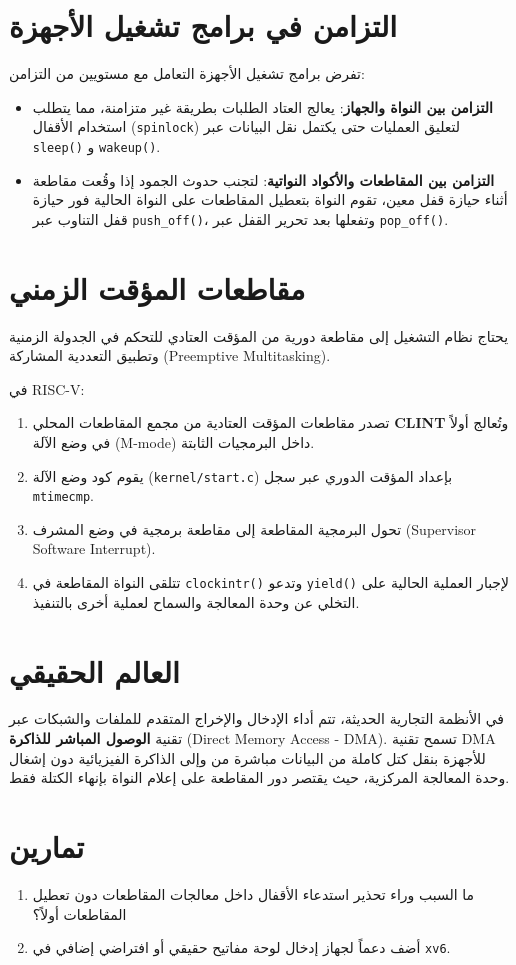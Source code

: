 \section{التزامن في برامج تشغيل الأجهزة}
\label{sec:concurrency_drivers}

تفرض برامج تشغيل الأجهزة التعامل مع مستويين من التزامن:
\begin{itemize}
  \item \textbf{التزامن بين النواة والجهاز}: يعالج العتاد الطلبات بطريقة غير متزامنة، مما يتطلب استخدام الأقفال (\texttt{spinlock}) لتعليق العمليات حتى يكتمل نقل البيانات عبر \texttt{sleep()} و \texttt{wakeup()}.
  \item \textbf{التزامن بين المقاطعات والأكواد النواتية}: لتجنب حدوث الجمود إذا وقُعت مقاطعة أثناء حيازة قفل معين، تقوم النواة بتعطيل المقاطعات على النواة الحالية فور حيازة قفل التناوب عبر \texttt{push\_off()}، وتفعلها بعد تحرير القفل عبر \texttt{pop\_off()}.
\end{itemize}

\section{مقاطعات المؤقت الزمني}
\label{sec:timer_interrupts}

يحتاج نظام التشغيل إلى مقاطعة دورية من المؤقت العتادي للتحكم في الجدولة الزمنية وتطبيق التعددية المشاركة (Preemptive Multitasking).

في RISC-V:
\begin{enumerate}
  \item تصدر مقاطعات المؤقت العتادية من مجمع المقاطعات المحلي \textbf{CLINT} وتُعالج أولاً في وضع الآلة (M-mode) داخل البرمجيات الثابتة.
  \item يقوم كود وضع الآلة (\texttt{kernel/start.c}) بإعداد المؤقت الدوري عبر سجل \texttt{mtimecmp}.
  \item تحول البرمجية المقاطعة إلى مقاطعة برمجية في وضع المشرف (Supervisor Software Interrupt).
  \item تتلقى النواة المقاطعة في \texttt{clockintr()} وتدعو \texttt{yield()} لإجبار العملية الحالية على التخلي عن وحدة المعالجة والسماح لعملية أخرى بالتنفيذ.
\end{enumerate}

\section{العالم الحقيقي}
\label{sec:real_world_interrupt}

في الأنظمة التجارية الحديثة، تتم أداء الإدخال والإخراج المتقدم للملفات والشبكات عبر تقنية \textbf{الوصول المباشر للذاكرة} (Direct Memory Access - DMA). تسمح تقنية DMA للأجهزة بنقل كتل كاملة من البيانات مباشرة من وإلى الذاكرة الفيزيائية دون إشغال وحدة المعالجة المركزية، حيث يقتصر دور المقاطعة على إعلام النواة بإنهاء الكتلة فقط.

\section{تمارين}
\label{sec:exercises_interrupt}

\begin{enumerate}
  \item ما السبب وراء تحذير استدعاء الأقفال داخل معالجات المقاطعات دون تعطيل المقاطعات أولاً؟
  \item أضف دعماً لجهاز إدخال لوحة مفاتيح حقيقي أو افتراضي إضافي في \texttt{xv6}.
\end{enumerate}
